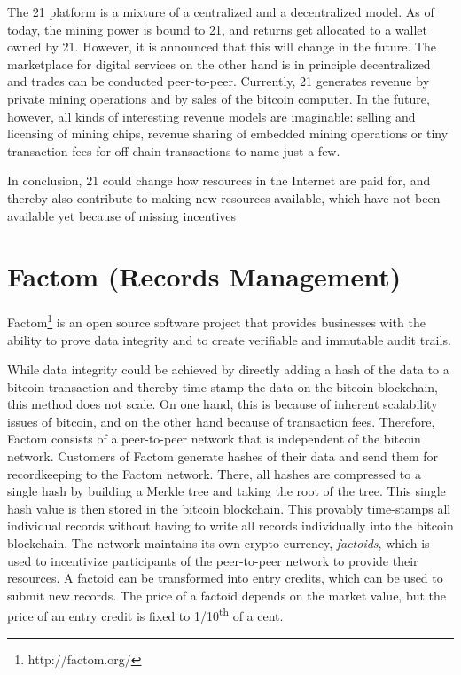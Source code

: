 {The 21 platform is a mixture of a centralized and a decentralized model. As of 
today, the mining power is bound to 21, and returns get allocated to a wallet owned 
by 21. However, it is announced that this will change in the future. The marketplace 
for digital services on the other hand is in principle decentralized and trades 
can be conducted peer-to-peer. Currently, 21 generates revenue by private mining 
operations and by sales of the bitcoin computer. In the future, however, all kinds 
of interesting revenue models are imaginable: selling and licensing of mining chips, 
revenue sharing of embedded mining operations or tiny transaction fees for off-chain 
transactions to name just a few. 

In conclusion, 21 could change how resources in the Internet are paid for, and 
thereby also contribute to making new resources available, which have not been 
available yet because of missing incentives

\section{Factom (Records Management)}
\label{sec:ecofactom}

Factom\footnote{http://factom.org/} is an open source software project that provides businesses with 
the ability to prove data integrity and to create verifiable and immutable audit 
trails. 

While data integrity could be achieved by directly adding a hash of the data to 
a bitcoin transaction and thereby time-stamp the data on the bitcoin blockchain, 
this method does not scale. On one hand, this is because of inherent scalability 
issues of bitcoin, and on the other hand because of transaction fees. Therefore, 
Factom consists of a peer-to-peer network that is independent of the bitcoin network. 
Customers of Factom generate hashes of their data and send them for recordkeeping 
to the Factom network. There, all hashes are compressed to a single hash by building 
a Merkle tree and taking the root of the tree. This single hash 
value is then stored in the bitcoin blockchain. This provably time-stamps all individual 
records without having to write all records individually into the bitcoin blockchain. 
The network maintains its own crypto-currency, \emph{factoids}, which is used to incentivize 
participants of the peer-to-peer network to provide their resources. A factoid 
can be transformed into entry credits, which can be used to submit new records. 
The price of a factoid depends on the market value, but the price of an entry credit 
is fixed to 1/10\textsuperscript{th} of a cent. 

}

